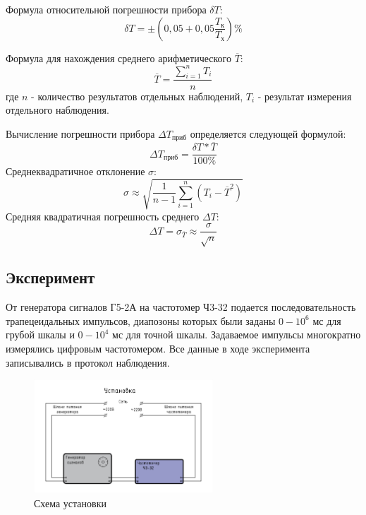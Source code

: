 Формула относительной погрешности прибора $\delta T$:
\begin{equation}
  \delta T = \pm (0,05 + 0,05  \frac{T_{\text{к}}}{T_{\text{х}}})\%
\end{equation}

Формула для нахождения среднего арифметического $\overline{T}$:
\begin{equation}
  \overline{T} = \frac{\sum_{i=1}^{n} T_i}{n}
\end{equation}
где $n$ - количество результатов отдельных наблюдений, $T_i$ - результат измерения отдельного наблюдения.

Вычисление погрешности прибора $\Delta T_{\text{приб}}$ определяется следующей формулой:
\begin{equation}
  \Delta T_{\text{приб}} = \frac{\delta T *\overline{T}}{100\%}
\end{equation}
Среднеквадратичное отклонение $\sigma$:
\begin{equation}
  \sigma \approx \sqrt{\frac{1}{n-1} \sum_{i = 1}^{n} (T_i -\overline{T}^2)}
\end{equation}
Средняя квадратичная погрешность среднего $\Delta T$:
\begin{equation}
  \Delta T = \sigma_{\overline{T}} \approx \frac{\sigma}{\sqrt{n}}
\end{equation}

\subsection{Эксперимент}
От генератора сигналов Г5-2А на частотомер Ч3-32 подается последовательность
трапецеидальных импульсов, диапозоны которых были заданы $0-10^6$ мс для грубой шкалы и $0-10^4$ мс для точной шкалы.
Задаваемое импульсы многократно измерялись цифровым частотомером. Все данные в ходе эксперимента записывались в протокол наблюдения.

\begin{figure}[H]
\centering
\includegraphics[width=0.6\textwidth]{Schema.png}
\caption{Схема установки}
\label{fig:sketch}
\end{figure}


